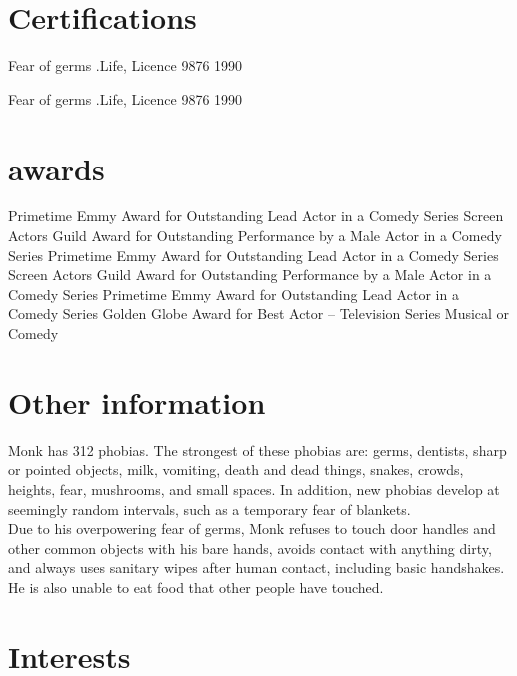 \documentclass[]{mcec-cv}
\begin{document}
\section{Certifications}

\begin{mcecnlist}

\nitem
{Fear of germs}
{.Life, Licence 9876}
{1990}

\nitem
{Fear of germs}
{.Life, Licence 9876}
{1990}
    
\end{mcecnlist}

\section{awards}

\begin{mcecslist}

 {Primetime Emmy Award for Outstanding Lead Actor in a Comedy Series}
 {Screen Actors Guild Award for Outstanding Performance by a Male Actor in a Comedy Series}
 {Primetime Emmy Award for Outstanding Lead Actor in a Comedy Series}
 {Screen Actors Guild Award for Outstanding Performance by a Male Actor in a Comedy Series}
 {Primetime Emmy Award for Outstanding Lead Actor in a Comedy Series}
 {Golden Globe Award for Best Actor – Television Series Musical or Comedy}

\end{mcecslist}

\section{Other information}
Monk has 312 phobias. The strongest of these phobias are: germs, dentists, sharp or pointed objects, milk, vomiting, death and dead things, snakes, crowds, heights, fear, mushrooms, and small spaces. In addition, new phobias develop at seemingly random intervals, such as a temporary fear of blankets.\\
Due to his overpowering fear of germs, Monk refuses to touch door handles and other common objects with his bare hands, avoids contact with anything dirty, and always uses sanitary wipes after human contact, including basic handshakes. He is also unable to eat food that other people have touched.

\section{Interests}

\end{document}
